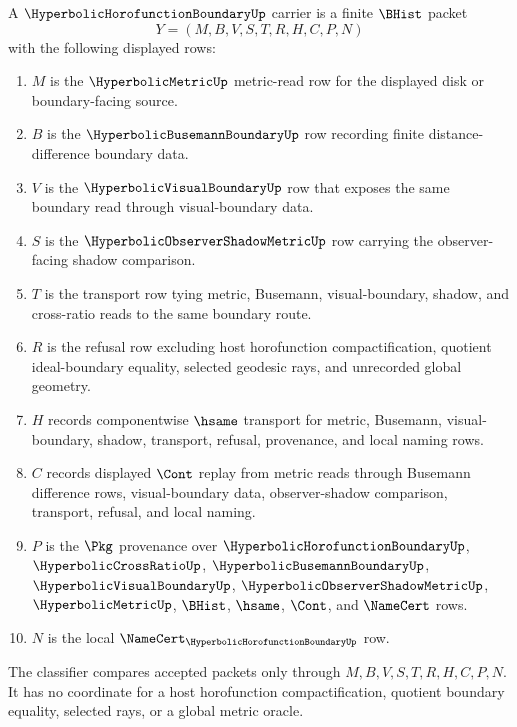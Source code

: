 \begin{definition}
\label{def:hyperbolic-horofunction-boundary-carrier}
A $\HyperbolicHorofunctionBoundaryUp$ carrier is a finite $\BHist$ packet
$$
Y=(M,B,V,S,T,R,H,C,P,N)
$$
with the following displayed rows:
\begin{enumerate}
\item $M$ is the $\HyperbolicMetricUp$ metric-read row for the displayed disk or boundary-facing source.
\item $B$ is the $\HyperbolicBusemannBoundaryUp$ row recording finite distance-difference boundary data.
\item $V$ is the $\HyperbolicVisualBoundaryUp$ row that exposes the same boundary read through visual-boundary data.
\item $S$ is the $\HyperbolicObserverShadowMetricUp$ row carrying the observer-facing shadow comparison.
\item $T$ is the transport row tying metric, Busemann, visual-boundary, shadow, and cross-ratio reads to the same boundary route.
\item $R$ is the refusal row excluding host horofunction compactification, quotient ideal-boundary equality, selected geodesic rays, and unrecorded global geometry.
\item $H$ records componentwise $\hsame$ transport for metric, Busemann, visual-boundary, shadow, transport, refusal, provenance, and local naming rows.
\item $C$ records displayed $\Cont$ replay from metric reads through Busemann difference rows, visual-boundary data, observer-shadow comparison, transport, refusal, and local naming.
\item $P$ is the $\Pkg$ provenance over $\HyperbolicHorofunctionBoundaryUp$, $\HyperbolicCrossRatioUp$, $\HyperbolicBusemannBoundaryUp$, $\HyperbolicVisualBoundaryUp$, $\HyperbolicObserverShadowMetricUp$, $\HyperbolicMetricUp$, $\BHist$, $\hsame$, $\Cont$, and $\NameCert$ rows.
\item $N$ is the local $\NameCert_{\HyperbolicHorofunctionBoundaryUp}$ row.
\end{enumerate}
The classifier compares accepted packets only through $M,B,V,S,T,R,H,C,P,N$. It has no coordinate for a host horofunction compactification, quotient boundary equality, selected rays, or a global metric oracle.
\end{definition}

